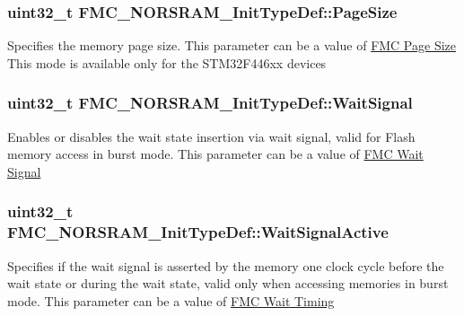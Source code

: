 \subsubsection[{\texorpdfstring{Page\+Size}{PageSize}}]{\setlength{\rightskip}{0pt plus 5cm}uint32\+\_\+t F\+M\+C\+\_\+\+N\+O\+R\+S\+R\+A\+M\+\_\+\+Init\+Type\+Def\+::\+Page\+Size}\hypertarget{struct_f_m_c___n_o_r_s_r_a_m___init_type_def_a419ca7c73455102bad5d08bcb499535e}{}\label{struct_f_m_c___n_o_r_s_r_a_m___init_type_def_a419ca7c73455102bad5d08bcb499535e}
Specifies the memory page size. This parameter can be a value of \hyperlink{group___f_m_c___page___size}{F\+MC Page Size} This mode is available only for the S\+T\+M32\+F446xx devices 
\subsubsection[{\texorpdfstring{Wait\+Signal}{WaitSignal}}]{\setlength{\rightskip}{0pt plus 5cm}uint32\+\_\+t F\+M\+C\+\_\+\+N\+O\+R\+S\+R\+A\+M\+\_\+\+Init\+Type\+Def\+::\+Wait\+Signal}\hypertarget{struct_f_m_c___n_o_r_s_r_a_m___init_type_def_a7cff014761b0db5e497e668b66ac0507}{}\label{struct_f_m_c___n_o_r_s_r_a_m___init_type_def_a7cff014761b0db5e497e668b66ac0507}
Enables or disables the wait state insertion via wait signal, valid for Flash memory access in burst mode. This parameter can be a value of \hyperlink{group___f_m_c___wait___signal}{F\+MC Wait Signal} 
\subsubsection[{\texorpdfstring{Wait\+Signal\+Active}{WaitSignalActive}}]{\setlength{\rightskip}{0pt plus 5cm}uint32\+\_\+t F\+M\+C\+\_\+\+N\+O\+R\+S\+R\+A\+M\+\_\+\+Init\+Type\+Def\+::\+Wait\+Signal\+Active}\hypertarget{struct_f_m_c___n_o_r_s_r_a_m___init_type_def_a7c1ca739b9c8ec32feebc9a84a6a4b1c}{}\label{struct_f_m_c___n_o_r_s_r_a_m___init_type_def_a7c1ca739b9c8ec32feebc9a84a6a4b1c}
Specifies if the wait signal is asserted by the memory one clock cycle before the wait state or during the wait state, valid only when accessing memories in burst mode. This parameter can be a value of \hyperlink{group___f_m_c___wait___timing}{F\+MC Wait Timing} 
